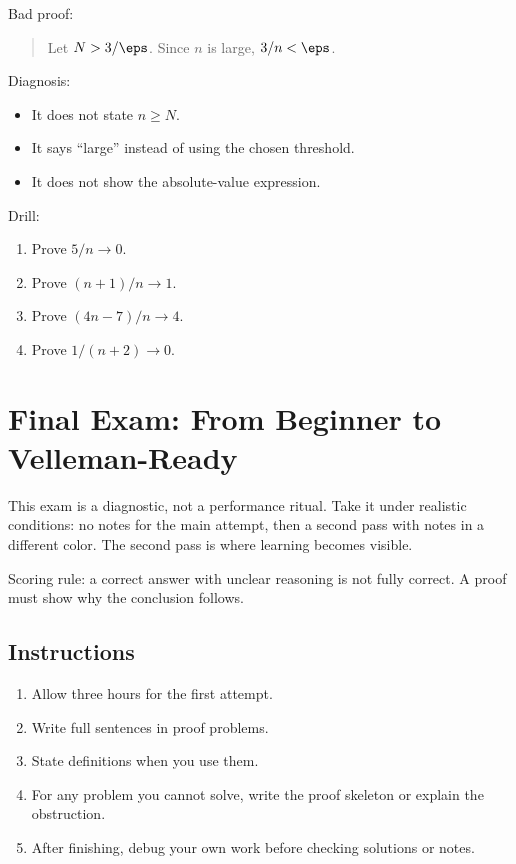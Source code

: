 Bad proof:

\begin{quote}
Let $N>3/\eps$. Since $n$ is large, $3/n<\eps$.
\end{quote}

Diagnosis:

\begin{itemize}
\item It does not state $n\geq N$.
\item It says ``large'' instead of using the chosen threshold.
\item It does not show the absolute-value expression.
\end{itemize}

Drill:

\begin{enumerate}
\item Prove $5/n\to0$.
\item Prove $(n+1)/n\to1$.
\item Prove $(4n-7)/n\to4$.
\item Prove $1/(n+2)\to0$.
\end{enumerate}

\section{Final Exam: From Beginner to Velleman-Ready}
\chapterline

This exam is a diagnostic, not a performance ritual. Take it under realistic conditions: no notes for the main attempt, then a second pass with notes in a different color. The second pass is where learning becomes visible.

\begin{focusbox}
Scoring rule: a correct answer with unclear reasoning is not fully correct. A proof must show why the conclusion follows.
\end{focusbox}

\subsection{Instructions}

\begin{enumerate}
\item Allow three hours for the first attempt.
\item Write full sentences in proof problems.
\item State definitions when you use them.
\item For any problem you cannot solve, write the proof skeleton or explain the obstruction.
\item After finishing, debug your own work before checking solutions or notes.
\end{enumerate}

